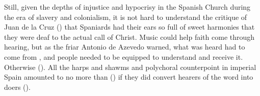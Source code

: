 
Still, given the depths of injustice and hypocrisy in the Spanish Church during
the era of slavery and colonialism, it is not hard to understand the critique
of Juan de la Cruz () that Spaniards had their ears so
full of sweet harmonies that they were deaf to the actual call of Christ.%
    \Autocite
    [, , ]
    {JuandelaCruz:Subida}
Music could help faith come through hearing, but as the friar Antonio de
Azevedo warned, what was heard had to come from ,
and people needed to be equipped to understand and receive it.%
    \Autocite{Azevedo:Catecismo}
Otherwise 
().
All the harps and shawms and polychoral counterpoint in imperial Spain
amounted to no more than 
() if they did convert hearers of the word into doers
().


